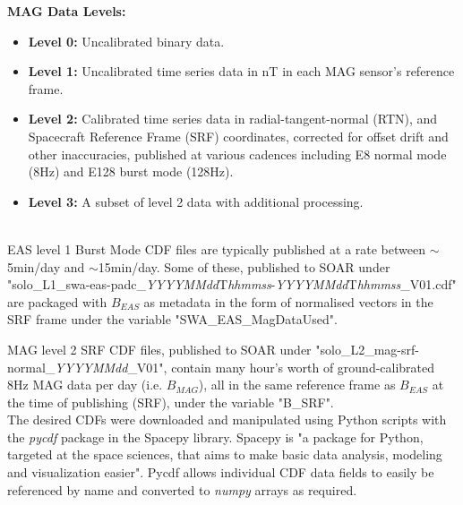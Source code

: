 \textbf{MAG Data Levels\cite{horbury2020}:}
\begin{itemize}
    \item \textbf{Level 0:} Uncalibrated binary data.
    \item \textbf{Level 1:} Uncalibrated time series data in nT in each MAG sensor's reference frame.
    \item \textbf{Level 2:} Calibrated time series data in radial-tangent-normal (RTN), and Spacecraft Reference Frame (SRF) coordinates, corrected for offset drift and other inaccuracies, published at various cadences including E8 normal mode (8Hz) and E128 burst mode (128Hz).
    \item \textbf{Level 3:} A subset of level 2 data with additional processing.
\end{itemize}
\\

EAS level 1 Burst Mode CDF files are typically published at a rate between \(\sim\)5min/day and \(\sim\)15min/day. Some of these, published to SOAR under "solo\_L1\_swa-eas-padc\_\textit{YYYYMMdd}T\textit{hhmmss}-\textit{YYYYMMdd}T\textit{hhmmss}\_V01.cdf" are packaged with \(B_{EAS}\) as metadata in the form of normalised vectors in the SRF frame under the variable "SWA\_EAS\_MagDataUsed". 

MAG level 2 SRF CDF files, published to SOAR under "solo\_L2\_mag-srf-normal\_\textit{YYYYMMdd}\_V01", contain many hour's worth of ground-calibrated 8Hz MAG data per day (i.e. \(B_{MAG}\)), all in the same reference frame as \(B_{EAS}\) at the time of publishing (SRF), under the variable "B\_SRF".
\\

The desired CDFs were downloaded and manipulated using Python scripts with the \textit{pycdf} package in the Spacepy library. Spacepy is "a package for Python, targeted at the space sciences, that aims to make basic data analysis, modeling and visualization easier"\cite{niehof2022spacepy}. Pycdf allows individual CDF data fields to easily be referenced by name and converted to \textit{numpy} arrays as required\cite{harris2020numpy}.

